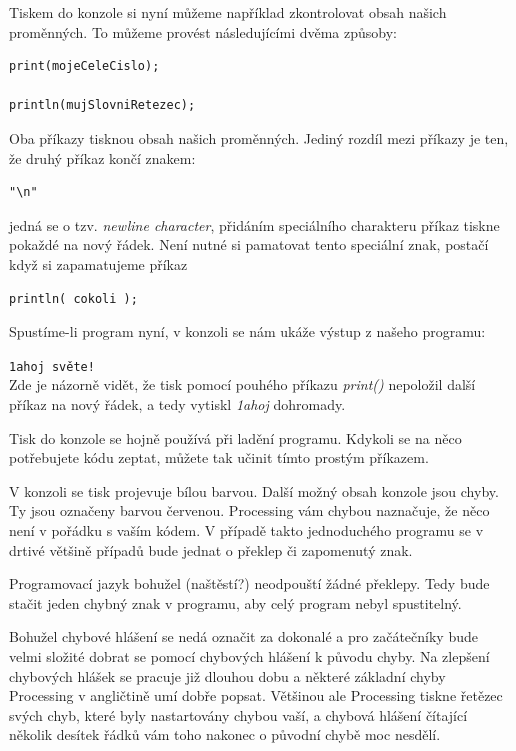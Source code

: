 \documentclass[10pt]{book}
\newcommand{\vyraz}[1]{\textit{\gls{#1}}\index{#1}\label{#1}}
\newcommand{\console}[1]{\texttt{\footnotesize #1}}
\begin{document}
Tiskem do konzole si nyní můžeme například zkontrolovat obsah našich proměnných. To můžeme provést následujícími dvěma způsoby:


\begin{lstlisting}
print(mojeCeleCislo);

println(mujSlovniRetezec);
\end{lstlisting}

Oba příkazy tisknou obsah našich proměnných. Jediný rozdíl mezi příkazy je ten, že druhý příkaz končí znakem:
 
\begin{lstlisting}
"\n"
\end{lstlisting}

jedná se o tzv. {\em newline character}, přidáním speciálního charakteru příkaz tiskne pokaždé na nový řádek. Není nutné si pamatovat tento speciální znak, postačí když si zapamatujeme příkaz 

\begin{lstlisting}
println( cokoli );

\end{lstlisting}

Spustíme-li program nyní, v konzoli se nám ukáže výstup z našeho programu:

\console{1ahoj světe!}\\

Zde je názorně vidět, že tisk pomocí pouhého příkazu \vyraz{print()} nepoložil další příkaz na nový řádek, a tedy vytiskl {\em 1ahoj} dohromady.

Tisk do konzole se hojně používá při ladění programu. Kdykoli se na něco potřebujete kódu zeptat, můžete tak učinit tímto prostým příkazem.

V konzoli se tisk projevuje bílou barvou. Další možný obsah konzole jsou chyby. Ty jsou označeny barvou červenou. Processing vám chybou naznačuje, že něco není v pořádku s vaším kódem. V případě takto jednoduchého programu se v drtivé většině případů bude jednat o překlep či zapomenutý znak.

Programovací jazyk bohužel (naštěstí?) neodpouští žádné překlepy. Tedy bude stačit jeden chybný znak v programu, aby celý program nebyl spustitelný.

Bohužel chybové hlášení se nedá označit za dokonalé a pro začátečníky bude velmi složité dobrat se pomocí chybových hlášení k původu chyby. Na zlepšení chybových hlášek se pracuje již dlouhou dobu a některé základní chyby Processing v angličtině umí dobře popsat. Většinou ale Processing tiskne řetězec svých chyb, které byly nastartovány chybou vaší, a chybová hlášení čítající několik desítek řádků vám toho nakonec o původní chybě moc nesdělí.
\end{document}
